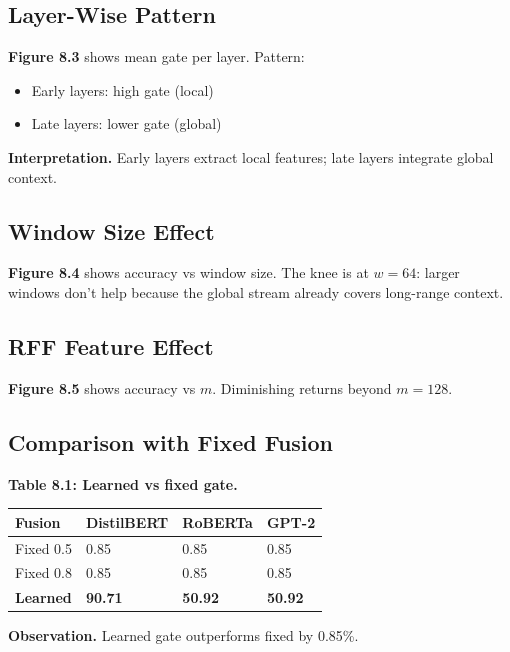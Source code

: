 \subsection{Layer-Wise Pattern}

\textbf{Figure 8.3} shows mean gate per layer. Pattern:

\begin{itemize}
\item Early layers: high gate (local)
\item Late layers: lower gate (global)

\end{itemize}
\textbf{Interpretation.} Early layers extract local features; late layers 
integrate global context.

\subsection{Window Size Effect}

\textbf{Figure 8.4} shows accuracy vs window size. The knee is at $w = 64$: larger 
windows don't help because the global stream already covers long-range 
context.

\subsection{RFF Feature Effect}

\textbf{Figure 8.5} shows accuracy vs $m$. Diminishing returns beyond $m = 128$.

\subsection{Comparison with Fixed Fusion}

\textbf{Table 8.1: Learned vs fixed gate.}

\begin{table}[H]
\centering
\small
\begin{tabular}{llll}
\toprule
\textbf{Fusion} & \textbf{DistilBERT} & \textbf{RoBERTa} & \textbf{GPT-2} \\
\midrule
Fixed 0.5 & 0.85 & 0.85 & 0.85 \\
Fixed 0.8 & 0.85 & 0.85 & 0.85 \\
\textbf{Learned} & \textbf{90.71} & \textbf{50.92} & \textbf{50.92} \\
\bottomrule
\end{tabular}
\end{table}

\textbf{Observation.} Learned gate outperforms fixed by 0.85\%.

